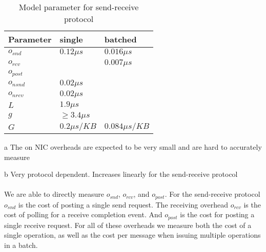 \begin{table}[!ht]
\setlength\tabcolsep{1.5pt}
\centering
\caption{Model parameter for send-receive protocol}
\label{tab:model}
\begin{threeparttable}[t]
 \begin{tabular}{|x{3.5cm}|x{3.5cm}|x{3.5cm}|} %
 \hline
 Parameter    &  single & batched \\
  \hline
  \hline
 $o_{snd}$    & $0.12 \mu s$ &  $0.016 \mu s$\\
  \hline
 $o_{rcv}$    &  & $0.007 \mu s$\\
  \hline
 $o_{post}$   &  & \\
  \hline
 $o_{nsnd}$   & $0.02 \mu s$ &   \\
  \hline
 $o_{nrcv}$   & $0.02 \mu s$ &   \\
  \hline
 $L$          & $1.9 \mu s$ &  \\
  \hline
 $g$          & $\geq 3.4 \mu s$  & \\
 \hline
 $G$          & $0.2\mu s / KB$  & $0.084\mu s / KB$\\

\hline
\end{tabular}
\begin{tablenotes}
\item[a] \small The on NIC overheads are expected to be very small and are hard to accurately measure
\item[b] \small Very protocol dependent. Increases linearly for the send-receive protocol
\end{tablenotes}
\end{threeparttable}
\end{table}


\paragraph{} We are able to directly measure $o_{snd}$, $o_{rcv}$, and $o_{post}$. For the send-receive protocol $o_{snd}$ is the cost of 
posting a single send request. The receiving overhead $o_{rcv}$ is the cost of polling for a receive completion event. And
$o_{post}$ is the cost for posting a single receive request. For all of these overheads we measure both the cost of a single
operation, as well as the cost per message when issuing multiple operations in a batch.

